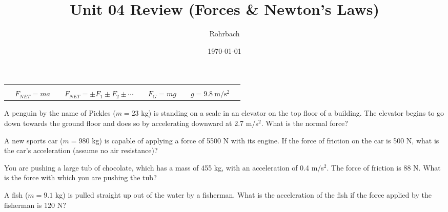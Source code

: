\documentclass[10pt]{exam}
\title{Unit 04 Review (Forces \& Newton's Laws)}
\author{Rohrbach}
\date{\today}
\newcommand{\printeqs}{
  \begin{center}
    \begin{tabular}{|*9c|}
      \hline 
      &&&&&&&&\\
      &
      $F_{NET}=ma$ &&
      $F_{NET}=\pm F_1 \pm F_2 \pm \cdots$ &&
      $F_G=mg$ &&
      $g=\SI{9.8}{\meter\per\second^2}$ &
      \\
      \hline
    \end{tabular}
  \end{center}
}
\begin{document}
\maketitle

\printeqs

\begin{questions}


\question
  A penguin by the name of Pickles ($m=23$ kg) is standing on a scale in an elevator on the top floor of a building.  The elevator begins to go down towards the ground floor and does so by accelerating downward at 2.7 m/s$^2$.  What is the normal force?
  \vs

\question
  A new sports car ($m=980$ kg) is capable of applying a force of 5500 N with its engine.  If the force of friction on the car is 500 N, what is the car's acceleration (assume no air resistance)? 
  \vs

\question
  You are pushing a large tub of chocolate, which has a mass of 455 kg, with an acceleration of 0.4 m/s$^2$.  The force of friction is 88 N.  What is the force with which you are pushing the tub?
  \vs

\question
  A fish ($m=9.1$ kg) is pulled straight up out of the water by a fisherman.  What is the acceleration of the fish if the force applied by the fisherman is 120 N?
  \vs


\pagebreak



\end{questions}
\end{document}
